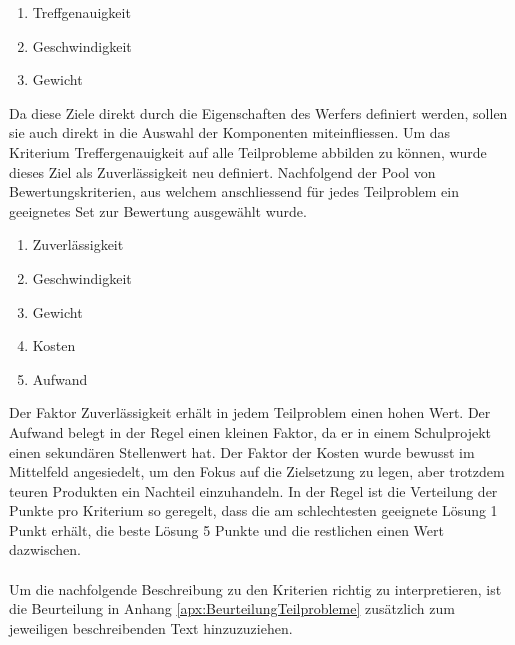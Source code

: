 		\begin{enumerate}
			\item Treffgenauigkeit
			\item Geschwindigkeit
			\item Gewicht
		\end{enumerate}		
		Da diese Ziele direkt durch die Eigenschaften des Werfers definiert werden, sollen sie auch direkt in die Auswahl der Komponenten miteinfliessen. Um das Kriterium Treffergenauigkeit auf alle Teilprobleme abbilden zu können, wurde dieses Ziel als Zuverlässigkeit neu definiert. Nachfolgend der Pool von Bewertungskriterien, aus welchem anschliessend für jedes Teilproblem ein geeignetes Set zur Bewertung ausgewählt wurde.
		
		\begin{enumerate}
			\item Zuverlässigkeit
			\item Geschwindigkeit
			\item Gewicht
			\item Kosten
			\item Aufwand
		\end{enumerate}		
		Der Faktor Zuverlässigkeit erhält in jedem Teilproblem einen hohen Wert. Der Aufwand belegt in der Regel einen kleinen Faktor, da er in einem Schulprojekt einen sekundären Stellenwert hat. Der Faktor der Kosten wurde bewusst im Mittelfeld angesiedelt, um den Fokus auf die Zielsetzung zu legen, aber trotzdem teuren Produkten ein Nachteil einzuhandeln.
		In der Regel ist die Verteilung der Punkte pro Kriterium so geregelt, dass die am schlechtesten geeignete Lösung 1 Punkt erhält, die beste Lösung 5 Punkte und die restlichen einen Wert dazwischen.\\
		\\
		Um die nachfolgende Beschreibung zu den Kriterien richtig zu interpretieren, ist die Beurteilung in Anhang \ref{apx:BeurteilungTeilprobleme} zusätzlich zum jeweiligen beschreibenden Text hinzuzuziehen. 
		

